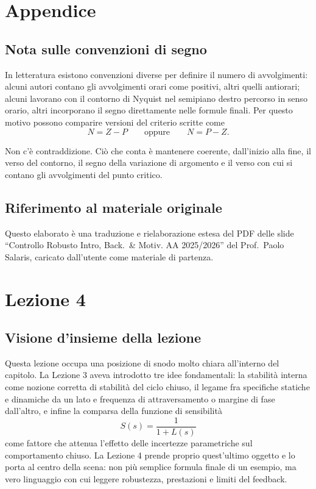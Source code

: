 \documentclass[11pt,a4paper]{article}
\begin{document}
\clearpage
{}
\section*{Appendice}

\subsection*{Nota sulle convenzioni di segno}
{}

In letteratura esistono convenzioni diverse per definire il numero di avvolgimenti: alcuni autori contano gli avvolgimenti orari come positivi, altri quelli antiorari; alcuni lavorano con il contorno di Nyquist nel semipiano destro percorso in senso orario, altri incorporano il segno direttamente nelle formule finali. Per questo motivo possono comparire versioni del criterio scritte come
$$
N = Z - P
\qquad \text{oppure} \qquad
N = P - Z.
$$

Non c’è contraddizione. Ciò che conta è mantenere coerente, dall’inizio alla fine, il verso del contorno, il segno della variazione di argomento e il verso con cui si contano gli avvolgimenti del punto critico.

\subsection*{Riferimento al materiale originale}
{}

Questo elaborato è una traduzione e rielaborazione estesa del PDF delle slide ``Controllo Robusto Intro, Back.\ \& Motiv. AA 2025/2026'' del Prof.\ Paolo Salaris, caricato dall’utente come materiale di partenza.


\newpage

\section{Lezione 4}

\subsection{Visione d'insieme della lezione}

Questa lezione occupa una posizione di snodo molto chiara all'interno del capitolo. La Lezione 3 aveva introdotto tre idee fondamentali: la stabilità interna come nozione corretta di stabilità del ciclo chiuso, il legame fra specifiche statiche e dinamiche da un lato e frequenza di attraversamento o margine di fase dall'altro, e infine la comparsa della funzione di sensibilità
$$
S(s)=\frac{1}{1+L(s)}
$$
come fattore che attenua l'effetto delle incertezze parametriche sul comportamento chiuso. La Lezione 4 prende proprio quest'ultimo oggetto e lo porta al centro della scena: non più semplice formula finale di un esempio, ma vero linguaggio con cui leggere robustezza, prestazioni e limiti del feedback.
\end{document}
